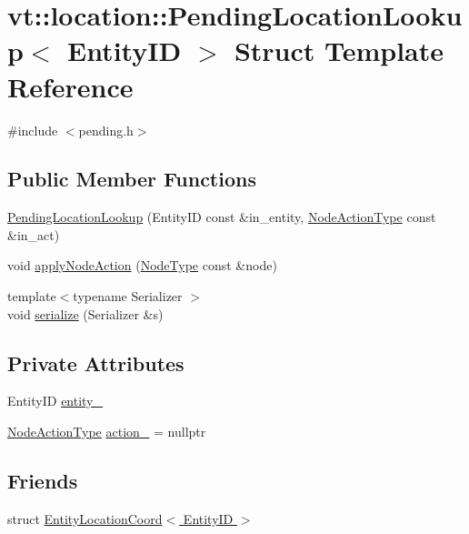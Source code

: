 \hypertarget{structvt_1_1location_1_1_pending_location_lookup}{}\section{vt\+:\+:location\+:\+:Pending\+Location\+Lookup$<$ Entity\+ID $>$ Struct Template Reference}
\label{structvt_1_1location_1_1_pending_location_lookup}


{\ttfamily \#include $<$pending.\+h$>$}

\subsection*{Public Member Functions}
\begin{DoxyCompactItemize}
\item 
\hyperlink{structvt_1_1location_1_1_pending_location_lookup_a31dee6a196bcc0fee50bdb983497b1f5}{Pending\+Location\+Lookup} (Entity\+ID const \&in\+\_\+entity, \hyperlink{namespacevt_1_1location_a3a9235e0ceb341bef225d2cc46606e9e}{Node\+Action\+Type} const \&in\+\_\+act)
\item 
void \hyperlink{structvt_1_1location_1_1_pending_location_lookup_a8e23682547f207d5403a0ee6a2224f37}{apply\+Node\+Action} (\hyperlink{namespacevt_a866da9d0efc19c0a1ce79e9e492f47e2}{Node\+Type} const \&node)
\item 
{\footnotesize template$<$typename Serializer $>$ }\\void \hyperlink{structvt_1_1location_1_1_pending_location_lookup_a8ce812aa98d3a19a9088b9680e3afd46}{serialize} (Serializer \&s)
\end{DoxyCompactItemize}
\subsection*{Private Attributes}
\begin{DoxyCompactItemize}
\item 
Entity\+ID \hyperlink{structvt_1_1location_1_1_pending_location_lookup_ac35da0e44b6048e6cc893f1498f1aa1d}{entity\+\_\+}
\item 
\hyperlink{namespacevt_1_1location_a3a9235e0ceb341bef225d2cc46606e9e}{Node\+Action\+Type} \hyperlink{structvt_1_1location_1_1_pending_location_lookup_a601536844f9545be1cdf913fcd49d393}{action\+\_\+} = nullptr
\end{DoxyCompactItemize}
\subsection*{Friends}
\begin{DoxyCompactItemize}
\item 
struct \hyperlink{structvt_1_1location_1_1_pending_location_lookup_abf8115ee4795af8b482a657aa6195a6a}{Entity\+Location\+Coord$<$ Entity\+I\+D $>$}
\end{DoxyCompactItemize}



